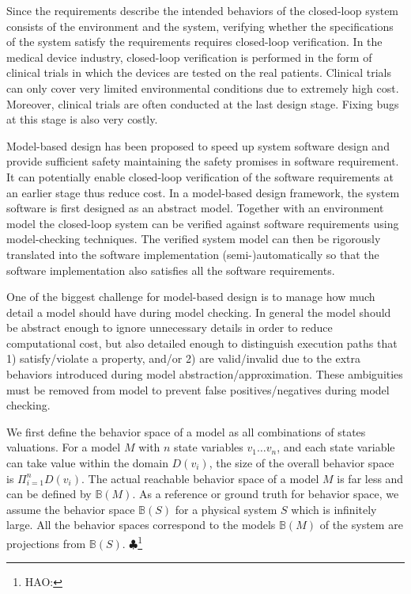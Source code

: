 \documentclass{llncs}
\newcommand{\Hao}[1]{$\clubsuit$\footnote{HAO: #1}}
\begin{document}
Since the requirements describe the intended behaviors of the closed-loop system consists of the environment and the system, verifying whether the specifications of the system satisfy the requirements requires closed-loop verification. In the medical device industry,    closed-loop verification is performed in the form of clinical trials in which the devices are tested on the real patients. Clinical trials can only cover very limited environmental conditions due to extremely high cost. Moreover, clinical trials are often conducted at the last design stage. Fixing bugs at this stage is also very costly.

Model-based design has been proposed to speed up system software design and provide sufficient safety maintaining the safety promises in software requirement. It can potentially enable closed-loop verification of the software requirements at an earlier stage thus reduce cost. In a model-based design framework, the system software is first designed as an abstract model. Together with an environment model the closed-loop system can be verified against software requirements using model-checking techniques. The verified system model can then be rigorously translated into the software implementation (semi-)automatically so that the software implementation also satisfies all the software requirements.


One of the biggest challenge for model-based design is to manage how much detail a model should have during model checking. In general the model should be abstract enough to ignore unnecessary details in order to reduce computational cost, but also detailed enough to distinguish execution paths that 1) satisfy/violate a property, and/or 2) are valid/invalid due to the extra behaviors introduced during model abstraction/approximation. These ambiguities must be removed from model to prevent false positives/negatives during model checking. 

We first define the behavior space of a model as all combinations of states valuations. For a model $M$ with $n$ state variables $v_1\dots v_n$, and each state variable can take value within the domain $D(v_i)$, the size of the overall behavior space is $\Pi_{i=1}^n D(v_i)$. The actual reachable behavior space of a model $M$ is far less and can be defined by $\mathbb{B}(M)$. As a reference or ground truth for behavior space, we assume the behavior space $\mathbb{B}(S)$ for a physical system $S$ which is infinitely large. All the behavior spaces correspond to the models $\mathbb{B}(M)$ of the system are projections from $\mathbb{B}(S)$.  
\Hao{}
\end{document}
